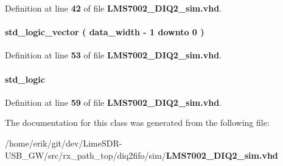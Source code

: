 Definition at line {\bf 42} of file {\bf L\+M\+S7002\+\_\+\+D\+I\+Q2\+\_\+sim.\+vhd}.

\paragraph[{S\+D\+R\+\_\+\+S\+I\+S\+O\+\_\+\+D\+IQ}]{ {\bfseries \textcolor{comment}{std\+\_\+logic\+\_\+vector}\textcolor{vhdlchar}{ }\textcolor{vhdlchar}{(}\textcolor{vhdlchar}{ }\textcolor{vhdlchar}{ }\textcolor{vhdlchar}{ }\textcolor{vhdlchar}{ }{\bfseries {\bf data\+\_\+width}} \textcolor{vhdlchar}{-\/}\textcolor{vhdlchar}{ } \textcolor{vhdldigit}{1} \textcolor{vhdlchar}{ }\textcolor{keywordflow}{downto}\textcolor{vhdlchar}{ }\textcolor{vhdlchar}{ } \textcolor{vhdldigit}{0} \textcolor{vhdlchar}{ }\textcolor{vhdlchar}{)}\textcolor{vhdlchar}{ }} \hspace{0.3cm}{\ttfamily [Signal]}}\label{classLMS7002__DIQ2__sim_1_1arch_a480badb01134a2120093a34200508e37}


Definition at line {\bf 53} of file {\bf L\+M\+S7002\+\_\+\+D\+I\+Q2\+\_\+sim.\+vhd}.

\paragraph[{trxiqpulse\+\_\+fsync}]{ {\bfseries \textcolor{comment}{std\+\_\+logic}\textcolor{vhdlchar}{ }} \hspace{0.3cm}{\ttfamily [Signal]}}\label{classLMS7002__DIQ2__sim_1_1arch_a7616d99ac64a74271e02257d14ceb046}


Definition at line {\bf 59} of file {\bf L\+M\+S7002\+\_\+\+D\+I\+Q2\+\_\+sim.\+vhd}.



The documentation for this class was generated from the following file\+:\begin{DoxyCompactItemize}
\item 
/home/erik/git/dev/\+Lime\+S\+D\+R-\/\+U\+S\+B\+\_\+\+G\+W/src/rx\+\_\+path\+\_\+top/diq2fifo/sim/{\bf L\+M\+S7002\+\_\+\+D\+I\+Q2\+\_\+sim.\+vhd}\end{DoxyCompactItemize}
